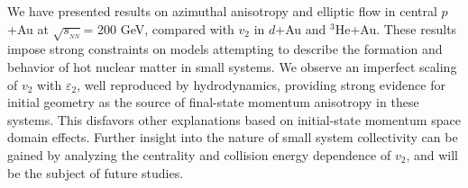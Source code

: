 \documentclass[%
reprint,
showpacs,preprintnumbers,
 amsmath,amssymb,
 aps,
]{revtex4-1}
\newcommand{\sqsn}{\mbox{$\sqrt{s_{_{NN}}}$}\xspace}
\newcommand{\dau}{\mbox{$d$+Au}\xspace}
\newcommand{\pau}{\mbox{$p$+Au}\xspace}
\newcommand{\hau}{\mbox{$^3\text{He}$+Au}\xspace}
\begin{document}
We have presented results on azimuthal anisotropy and elliptic flow in central \pau at \sqsn = 200 GeV, compared with $v_2$ in \dau and \hau. These results impose strong constraints on models attempting to describe the formation and behavior of hot nuclear matter in small systems. We observe an imperfect scaling of $v_2$ with $\varepsilon_2$, well reproduced by hydrodynamics, providing strong evidence for initial geometry as the source of final-state momentum anisotropy in these systems. This disfavors other explanations based on initial-state momentum space domain effects. Further insight into the nature of small system collectivity can be gained by analyzing the centrality and collision energy dependence of $v_2$, and will be the subject of future studies. 


\end{document}
